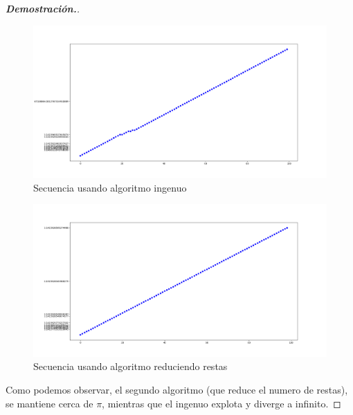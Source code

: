 \documentclass{article}
\begin{document}
\begin{enumerate}
\begin{mdframed}[
			      linecolor=darkgray,
		      ]
\begin{proof}[\textbf{Demostraci\'on.}]
            \begin{figure}[H]
             \caption{Secuencia usando algoritmo ingenuo}
				      \includegraphics[width=\textwidth]{naive_pi_approx}
            \end{figure}

            \begin{figure}[H]
             \caption{Secuencia usando algoritmo reduciendo restas}
				      \includegraphics[width=\textwidth]{pi_approx}
            \end{figure}
              
            Como podemos observar, el segundo algoritmo (que reduce el numero de restas), se mantiene cerca de $\pi$, mientras que el ingenuo explota y diverge a infinito.
		      \end{proof}
	      \end{mdframed}



\end{enumerate}
\end{document}
